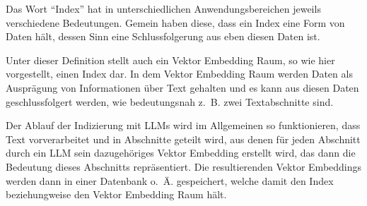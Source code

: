 \documentclass[../main.tex]{subfiles}
\begin{document}
Das Wort \enquote{Index} hat in unterschiedlichen Anwendungsbereichen jeweils verschiedene Bedeutungen.
Gemein haben diese, dass ein Index eine Form von Daten hält, dessen Sinn eine Schlussfolgerung aus eben diesen Daten ist.
\cite{Chatterjee2017Index,Lo2016What,Vickery1950THE}

Unter dieser Definition stellt auch ein Vektor Embedding Raum, so wie hier vorgestellt, einen Index dar.
In dem Vektor Embedding Raum werden Daten als Ausprägung von Informationen über Text gehalten und es kann aus diesen Daten geschlussfolgert werden, wie bedeutungsnah z. B. zwei Textabschnitte sind.

Der Ablauf der Indizierung mit \glspl{LLM} wird im Allgemeinen so funktionieren, dass Text vorverarbeitet und in Abschnitte geteilt wird, aus denen für jeden Abschnitt durch ein \gls{LLM} sein  dazugehöriges Vektor Embedding erstellt wird, das dann die Bedeutung dieses Abschnitts repräsentiert.
Die resultierenden Vektor Embeddings werden dann in einer Datenbank o. Ä. gespeichert, welche damit den Index beziehungweise den Vektor Embedding Raum hält.
\cite{ji2022speeding}
\end{document}
